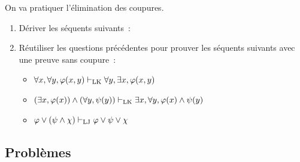 \begin{exercise}
  On va pratiquer l'élimination des coupures.
  \begin{enumerate}[label=(\roman*)]
    \item Dériver les séquents suivants~:

    \vspace{5pt}
  \item Réutiliser les questions précédentes pour prouver les séquents suivants
    avec une preuve sans coupure~:
    \begin{itemize}
    \item $\forall x,\forall y, \varphi(x,y)\vdash_{\operatorname{LK}}
      \forall y, \exists x, \varphi(x,y)$
    \item $(\exists x, \varphi(x))\land (\forall y,\psi(y))\vdash_{\operatorname{LK}}
      \exists x, \forall y, \varphi(x)\land \psi(y)$
    \item $\varphi\lor(\psi\land\chi)\vdash_{\operatorname{LJ}}\varphi\lor\psi\lor\chi$
    \end{itemize}
  \end{enumerate}
\end{exercise}

\clearpage

\subsection{Problèmes}

